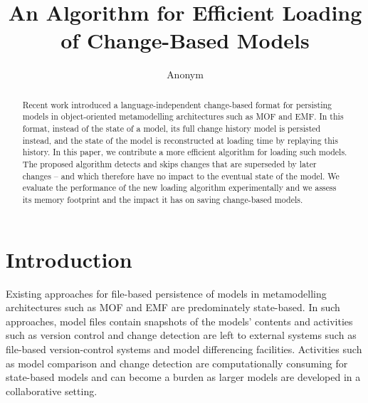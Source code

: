 \documentclass{llncs}
\begin{document}
\renewcommand{\thelstlisting}{\arabic{lstlisting}}
\renewcommand{\labelitemi}{$\bullet$}
\newcommand{\dk}[1]{\textbf{[DK: #1]}}

\title{An Algorithm for Efficient Loading \\ of Change-Based Models}
%
%
\author{
    Anonym%
}
%
%
%


\maketitle              %

\begin{abstract}

Recent work introduced a language-independent change-based format for persisting models in object-oriented metamodelling architectures such as MOF and EMF. In this format, instead of the state of a model, its full change history model is persisted instead, and the state of the model is reconstructed at loading time by replaying this history. In this paper, we contribute a more efficient algorithm for loading such models. The proposed algorithm detects and skips changes that are superseded by later changes -- and which therefore have no impact to the eventual state of the model. We evaluate the performance of the new loading algorithm experimentally and we assess its memory footprint and the impact it has on saving change-based models. 

\end{abstract}

\section{Introduction}
\label{sec:introduction}
Existing approaches for file-based persistence of models in metamodelling architectures such as MOF and EMF are predominately state-based. In such approaches, model files contain snapshots of the models' contents and activities such as version control and change detection are left to external systems such as file-based version-control systems and model differencing facilities. Activities such as model comparison and change detection are computationally consuming for state-based models and can become a burden as larger models are developed in a collaborative setting. 
\end{document}
